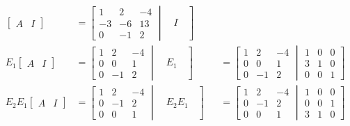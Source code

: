 \documentclass[pdf,9pt]{beamer}
\begin{document}
\begin{frame}[fragile]
    \begin{example}
	\begin{align*}
	    \left[\begin{array}{r|r}
		    A & I
	    \end{array}\right]
	    & =
	    \left[
		\begin{array}{rrr}
		    1 & 2 & -4 \\
		    -3 & -6 & 13 \\
		    0 & -1 & 2
		\end{array}\middle|\quad I \quad\right]\\[1em]
	    E_1 \left[\begin{array}{r|r}
		    A & I
	    \end{array}\right]
	    &=
	    \left[
		\begin{array}{rrr}
		    1 & 2 & -4 \\
		    0 & 0 & 1 \\
		    0 & -1 & 2
		\end{array}\middle| \quad E_1\quad \right]
	    &&=
	    \left[
		\begin{array}{rrr}
		    1 & 2 & -4 \\
		    0 & 0 & 1 \\
		    0 & -1 & 2
		\end{array}
		\middle|
		\begin{array}{rrr}
		    1 & 0 & 0 \\
		    3 & 1 & 0\\
		    0 & 0 & 1
		\end{array}
	    \right]
	    \\[1em]
	    E_2E_1 \left[\begin{array}{r|r}
		    A & I
	    \end{array}\right]
	    &=
	    \left[
		\begin{array}{rrr}
		    1 & 2 & -4 \\
		    0 & -1 & 2\\
		    0 & 0 & 1
		\end{array}\middle| \quad E_2E_1\quad\right]
	    &&=
	    \left[
		\begin{array}{rrr}
		    1 & 2 & -4 \\
		    0 & -1 & 2\\
		    0 & 0 & 1
		\end{array}
		\middle|
		\begin{array}{rrr}
		    1 & 0 & 0 \\
		    0 & 0 & 1\\
		    3 & 1 & 0
		\end{array}
	    \right]
	\end{align*}

    \end{example}
\end{frame}
\end{document}
